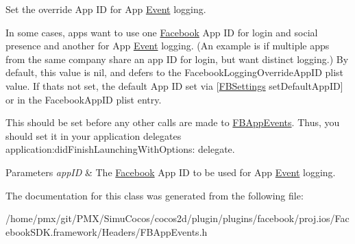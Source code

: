Set the \textquotesingle{}override\textquotesingle{} App ID for App \hyperlink{classEvent}{Event} logging.

In some cases, apps want to use one \hyperlink{interfaceFacebook}{Facebook} App ID for login and social presence and another for App \hyperlink{classEvent}{Event} logging. (An example is if multiple apps from the same company share an app ID for login, but want distinct logging.) By default, this value is {\ttfamily nil}, and defers to the {\ttfamily Facebook\+Logging\+Override\+App\+ID} plist value. If that\textquotesingle{}s not set, the default App ID set via \mbox{[}\hyperlink{interfaceFBSettings}{F\+B\+Settings} set\+Default\+App\+ID\mbox{]} or in the {\ttfamily Facebook\+App\+ID} plist entry.

This should be set before any other calls are made to {\ttfamily \hyperlink{interfaceFBAppEvents}{F\+B\+App\+Events}}. Thus, you should set it in your application delegate\textquotesingle{}s {\ttfamily application\+:did\+Finish\+Launching\+With\+Options\+:} delegate.


\begin{DoxyParams}{Parameters}
{\em app\+ID} & The \hyperlink{interfaceFacebook}{Facebook} App ID to be used for App \hyperlink{classEvent}{Event} logging. \\
\hline
\end{DoxyParams}


The documentation for this class was generated from the following file\+:\begin{DoxyCompactItemize}
\item 
/home/pmx/git/\+P\+M\+X/\+Simu\+Cocos/cocos2d/plugin/plugins/facebook/proj.\+ios/\+Facebook\+S\+D\+K.\+framework/\+Headers/F\+B\+App\+Events.\+h\end{DoxyCompactItemize}
